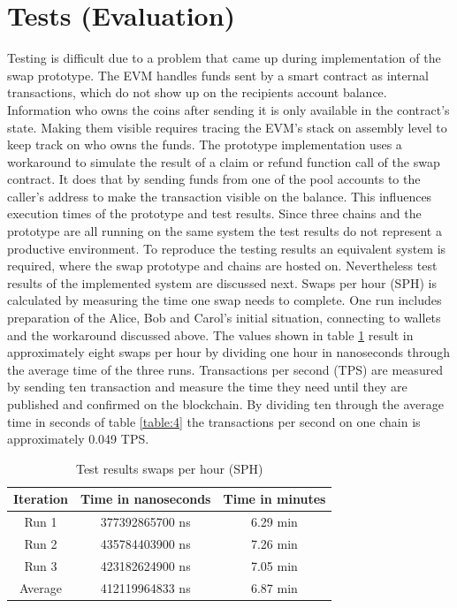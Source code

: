 \section{Tests (Evaluation)}
\label{sec:chapter04:poc}
Testing is difficult due to a problem that came up during implementation of the swap prototype. The \ac{EVM} handles funds sent by a smart contract as internal transactions, which do not show up on the recipients account balance. Information who owns the coins after sending it is only available in the contract's state. Making them visible requires tracing the \ac{EVM}'s stack on assembly level to keep track on who owns the funds. The prototype implementation uses a workaround to simulate the result of a claim or refund function call of the swap contract. It does that by sending funds from one of the pool accounts to the caller's address to make the transaction visible on the balance. This influences execution times of the prototype and test results. Since three chains and the prototype are all running on the same system the test results do not represent a productive environment. To reproduce the testing results an equivalent system is required, where the swap prototype and chains are hosted on. Nevertheless test results of the implemented system are discussed next. Swaps per hour (SPH) is calculated by measuring the time one swap needs to complete. One run includes preparation of the Alice, Bob and Carol's initial situation, connecting to wallets and the workaround discussed above. The values shown in table \ref{table:3} result in approximately eight swaps per hour by dividing one hour in nanoseconds through the average time of the three runs. Transactions per second (TPS) are measured by sending ten transaction and measure the time they need until they are published and confirmed on the blockchain. By dividing ten through the average time in seconds of table \ref{table:4} the transactions per second on one chain is approximately 0.049 TPS.

\begin{table}[h!]
	\centering
	\begin{tabular}{|c | c | c |} 
		\hline 
		Iteration & Time in nanoseconds & Time in minutes \\ [0.5ex] 
		\hline \hline
		Run 1 & 377392865700 ns & 6.29 min  \\ 
		\hline
		Run 2 & 435784403900 ns & 7.26 min  \\
		\hline
		Run 3 & 423182624900 ns & 7.05 min  \\
		\hline
		Average & 412119964833 ns & 6.87 min  \\ [1ex] 
		\hline
	\end{tabular}
	\caption{Test results swaps per hour (SPH)}
	\label{table:3}
\end{table}

